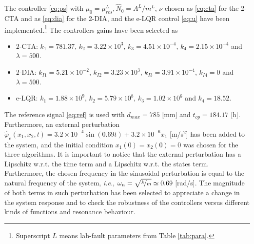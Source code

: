 \documentclass[journal,twoside,web]{ieeecolor}
\begin{document}
The controller \eqref{eq:ps} with $\mu_0=\mu_{res}^L, \hat{N}_0=A^L/m^L$, $\nu$ chosen as \eqref{eq:cta} for the 2-CTA and as \eqref{eq:dia} for the 2-DIA, and the e-LQR control \eqref{eq:u} have been implemented.\footnote{Superscript $L$ means lab-fault parameters from Table \ref{tab:para}.} The controllers gains have been selected as 
\begin{itemize}
  \item 2-CTA: $k_1=781.37$, $k_2=3.22\times 10^3$, $k_3=4.51 \times 10^{-4}$, $k_4=2.15 \times 10^{-4}$ and $\lambda=500$.
  \item 2-DIA: $k_{I1}=5.21\times 10^{-2}$, $k_{I2}=3.23\times 10^{3}$, $k_{I3}=3.91 \times 10^{-4}$, $k_{I4}=0$ and $\lambda=500$.
  \item e-LQR: $k_1=1.88\times 10^{9}$, $k_2=5.79\times 10^8$, $k_3=1.02\times 10^{6}$ and $k_4=18.52$.
  \label{simgains}
\end{itemize}

The reference signal \eqref{eq:ref} is used with $d_{max}=785$ [mm] and $t_{op}=184.17$ [h]. Furthermore, an external perturbation $\hat{\varphi}_e(x_1,x_2,t)= 3.2\times 10^{-4}\sin(0.69t) + 3.2\times 10^{-6}x_1$ [m/s$^2$] has been added to the system, and the initial condition $x_1(0)=x_2(0)=0$ was chosen for the three algorithms. It is important to notice that the external perturbation has a Lipschitz w.r.t. the time term and a Lipschitz w.r.t. the states term. Furthermore, the chosen frequency in the sinusoidal perturbation is equal to the natural frequency of the system, \textit{i.e.}, $\omega_n=\sqrt{\nicefrac{k}{m}}\simeq 0.69$ [rad/s]. The magnitude of both terms in such perturbation has been selected to appreciate a change in the system response and to check the robustness of the controllers versus different kinds of functions and resonance behaviour.
\end{document}
